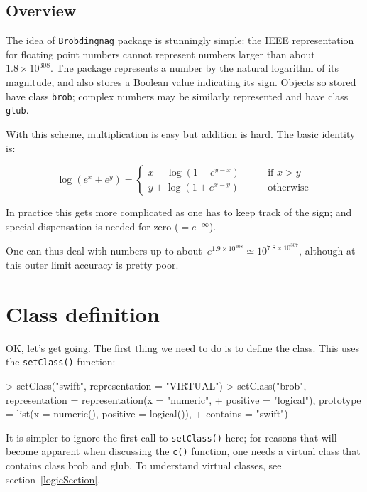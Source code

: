 \documentclass[a4paper]{article}
\begin{document}
\subsection{Overview}


The idea of {\tt Brobdingnag} package is stunningly simple: the IEEE
representation for floating point numbers cannot represent numbers
larger than about~$1.8\times 10^{308}$.  The package represents a number
by the natural logarithm of its magnitude, and also stores a Boolean
value indicating its sign.  Objects so stored have class {\tt brob};
complex numbers may be similarly represented and have class {\tt
glub}.

With this scheme, multiplication is easy but addition is hard.  The
basic identity is:

\[
\log(e^x+e^y) = 
\left\{
\begin{array}{cc}
x+\log\left(1+e^{y-x}\right)\qquad &\mbox{if~$x>y$}\\
y+\log\left(1+e^{x-y}\right)\qquad &\mbox{otherwise}
\end{array}
\right.
\]

In practice this gets more complicated as one has to keep track of the
sign; and special dispensation is needed for zero ($=e^{-\infty}$).

One can thus deal with numbers up to about~$e^{1.9\times
10^{308}}\simeq 10^{7.8\times 10^{307}}$, although at this outer limit
accuracy is pretty poor.



\section{Class definition}

OK, let's get going.   The first thing we need to do is to define the
class.  This uses the {\tt setClass()} function:

\begin{Schunk}
\begin{Sinput}
> setClass("swift", representation = "VIRTUAL")
> setClass("brob", representation = representation(x = "numeric", 
+     positive = "logical"), prototype = list(x = numeric(), positive = logical()), 
+     contains = "swift")
\end{Sinput}
\end{Schunk}

It is simpler to ignore the first call to {\tt setClass()} here; for
reasons that will become apparent when discussing the {\tt c()}
function, one needs a virtual class that contains class brob and glub.
To understand virtual classes, see section~\ref{logicSection}.
\end{document}
